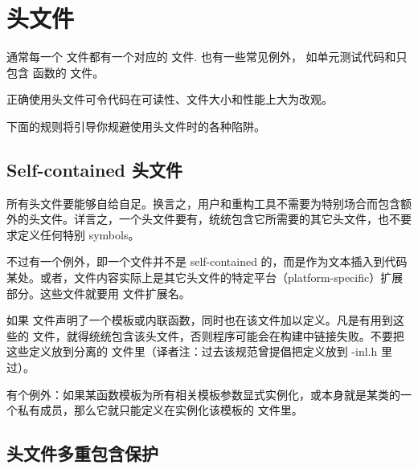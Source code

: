 \chapter{头文件}

通常每一个  文件都有一个对应的  文件. 也有一些常见例外， 如单元测试代码和只包含  函数的 文件。

正确使用头文件可令代码在可读性、文件大小和性能上大为改观。

下面的规则将引导你规避使用头文件时的各种陷阱。

\section{Self-contained 头文件} \label{self-contained-headers}


所有头文件要能够自给自足。换言之，用户和重构工具不需要为特别场合而包含额外的头文件。详言之，一个头文件要有，统统包含它所需要的其它头文件，也不要求定义任何特别 symbols。

不过有一个例外，即一个文件并不是 self-contained 的，而是作为文本插入到代码某处。或者，文件内容实际上是其它头文件的特定平台（platform-specific）扩展部分。这些文件就要用 文件扩展名。

如果  文件声明了一个模板或内联函数，同时也在该文件加以定义。凡是有用到这些的  文件，就得统统包含该头文件，否则程序可能会在构建中链接失败。不要把这些定义放到分离的  文件里（译者注：过去该规范曾提倡把定义放到 -inl.h 里过）。

有个例外：如果某函数模板为所有相关模板参数显式实例化，或本身就是某类的一个私有成员，那么它就只能定义在实例化该模板的  文件里。

\section{头文件多重包含保护} \label{qt-pragma-once-guard}



